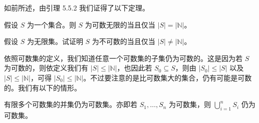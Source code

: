 如前所述，由引理 5.5.2 我们证得了以下定理。

\begin{proposition}
假设 $S$ 为一个集合。则 $S$ 为可数无限的当且仅当 $|S| = |\mathbb{N}|$。
\end{proposition}

\begin{question}
假设 $S$ 为无限集。试证明 $S$ 为不可数的当且仅当 $|S| \neq |\mathbb{N}|$。
\end{question}

依照可数集的定义，我们知道任意一个可数集的子集仍为可数的。这是因为若 $S$ 为可数的，则依定义我们有 $|S| \leq |\mathbb{N}|$，也因此若 $S_0 \subseteq S$，则由 $|S_0| \leq |S|$ 以及 $|S| \leq |\mathbb{N}|$，可得 $|S_0| \leq |\mathbb{N}|$。不过要注意的是比可数集大的集合，仍有可能是可数的。我们有以下的情形。

\begin{proposition}
有限多个可数集的并集仍为可数集。亦即若 $S_1, \dots, S_n$ 为可数集，则 $\bigcup_{i=1}^n S_i$ 仍为可数集。
\end{proposition}


